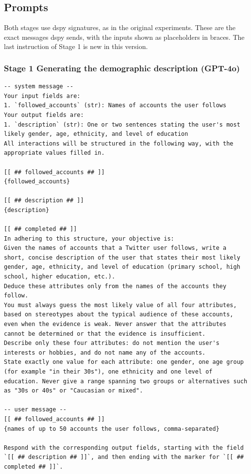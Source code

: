 \documentclass[10pt]{article}
\begin{document}
\subsection*{Prompts}
Both stages use dspy signatures, as in the original experiments. These are the exact messages dspy sends, with the inputs shown as placeholders in braces. The last instruction of Stage 1 is new in this version.

\subsubsection*{Stage 1 \textperiodcentered{} Generating the demographic description (GPT-4o)}
\begin{Verbatim}[breaklines,breakanywhere,fontsize=\footnotesize]
-- system message --
Your input fields are:
1. `followed_accounts` (str): Names of accounts the user follows
Your output fields are:
1. `description` (str): One or two sentences stating the user's most likely gender, age, ethnicity, and level of education
All interactions will be structured in the following way, with the appropriate values filled in.

[[ ## followed_accounts ## ]]
{followed_accounts}

[[ ## description ## ]]
{description}

[[ ## completed ## ]]
In adhering to this structure, your objective is: 
Given the names of accounts that a Twitter user follows, write a short, concise description of the user that states their most likely gender, age, ethnicity, and level of education (primary school, high school, higher education, etc.).
Deduce these attributes only from the names of the accounts they follow.
You must always guess the most likely value of all four attributes, based on stereotypes about the typical audience of these accounts, even when the evidence is weak. Never answer that the attributes cannot be determined or that the evidence is insufficient.
Describe only these four attributes: do not mention the user's interests or hobbies, and do not name any of the accounts.
State exactly one value for each attribute: one gender, one age group (for example "in their 30s"), one ethnicity and one level of education. Never give a range spanning two groups or alternatives such as "30s or 40s" or "Caucasian or mixed".

-- user message --
[[ ## followed_accounts ## ]]
{names of up to 50 accounts the user follows, comma-separated}

Respond with the corresponding output fields, starting with the field `[[ ## description ## ]]`, and then ending with the marker for `[[ ## completed ## ]]`.
\end{Verbatim}
\end{document}
